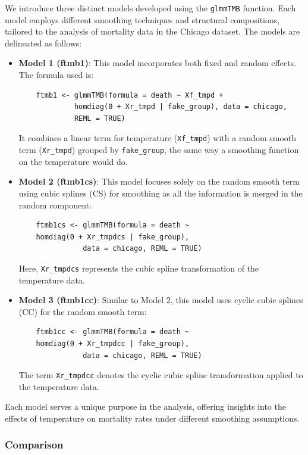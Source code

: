 \documentclass[12pt, twoside,hidelinks]{article}
\theoremstyle{definition}
\numberwithin{equation}{section}
\begin{document}
We introduce three distinct models developed using the \texttt{glmmTMB} function. Each model employs different smoothing techniques and structural compositions, tailored to the analysis of mortality data in the Chicago dataset. The models are delineated as follows:

\begin{itemize}
    \item \textbf{Model 1 (ftmb1)}: This model incorporates both fixed and random effects. The formula used is: 
    \begin{verbatim}
    ftmb1 <- glmmTMB(formula = death ~ Xf_tmpd +
             homdiag(0 + Xr_tmpd | fake_group), data = chicago,
             REML = TRUE)
    \end{verbatim}
    It combines a linear term for temperature (\texttt{Xf\_tmpd}) with a random smooth term (\texttt{Xr\_tmpd}) grouped by \texttt{fake\_group}, the same way a smoothing function on the temperature would do.

    \item \textbf{Model 2 (ftmb1cs)}: This model focuses solely on the random smooth term using cubic splines (CS) for smoothing as all the information is merged in the random component:
    \begin{verbatim}
    ftmb1cs <- glmmTMB(formula = death ~ 
    homdiag(0 + Xr_tmpdcs | fake_group), 
               data = chicago, REML = TRUE)
    \end{verbatim}
    Here, \texttt{Xr\_tmpdcs} represents the cubic spline transformation of the temperature data.

    \item \textbf{Model 3 (ftmb1cc)}: Similar to Model 2, this model uses cyclic cubic splines (CC) for the random smooth term:
    \begin{verbatim}
    ftmb1cc <- glmmTMB(formula = death ~ 
    homdiag(0 + Xr_tmpdcc | fake_group),
               data = chicago, REML = TRUE)
    \end{verbatim}
    The term \texttt{Xr\_tmpdcc} denotes the cyclic cubic spline transformation applied to the temperature data.
\end{itemize}



Each model serves a unique purpose in the analysis, offering insights into the effects of temperature on mortality rates under different smoothing assumptions.



\subsubsection{Comparison}
\end{document}
